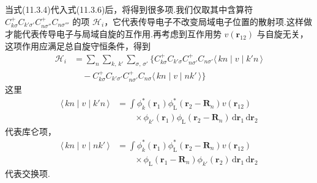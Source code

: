 当式(11.3.4)代入式(11.3.6)后，将得到很多项.我们仅取其中含算符
$C^{+}_{k\sigma}C_{k'\sigma'}C^{+}_{n\sigma''}C_{n\sigma'''}$
的项 $\mathscr{H}_{i}$，它代表传导电子不改变局域电子位置的散射项.这样做才能代表传导电子与局域自旋的互作用.再考虑到互作用势 $v(\boldsymbol{r}_{12})$ 与自旋无关，这项作用应满足总自旋守恒条件，得到
\begin{equation}
\begin{aligned}
  \mathscr{H}_{i}&=\sum_{n}\sum_{k,\,k'}\sum_{\sigma,\,\sigma'}
  \bigl\{C^{+}_{k\sigma}C_{k'\sigma}C^{+}_{n\sigma'}C_{n\sigma'}
  \langle\,kn\mid v\mid k'n\,\rangle\\
  &\quad-C^{+}_{k\sigma}C_{k'\sigma'}C^{+}_{n\sigma'}C_{n\sigma}
  \langle\,kn\mid v\mid nk'\,\rangle\bigr\}
\end{aligned}
\end{equation}
这里
\begin{equation}
\begin{aligned}
  \langle\,kn\mid v\mid k'n\,\rangle
  &=\int\phi^{*}_{k}(\boldsymbol{r}_{1})
  \phi^{*}_{\mathrm{L}}(\boldsymbol{r}_{2}-\boldsymbol{R}_{n})
  v(\boldsymbol{r}_{12})\\
  &\qquad\times\phi_{k'}(\boldsymbol{r}_{1})
  \phi_{\mathrm{L}}(\boldsymbol{r}_{2}-\boldsymbol{R}_{n})
  \,\mathrm{d}\boldsymbol{r}_{1}\,\mathrm{d}\boldsymbol{r}_{2}
\end{aligned}
\end{equation}
代表库仑项，
\begin{equation}
\begin{aligned}
  \langle\,kn\mid v\mid nk'\,\rangle
  &=\int\phi^{*}_{k}(\boldsymbol{r}_{1})
  \phi^{*}_{\mathrm{L}}(\boldsymbol{r}_{2}-\boldsymbol{R}_{n})
  v(\boldsymbol{r}_{12})\\
  &\qquad\times\phi_{\mathrm{L}}(\boldsymbol{r}_{1}-\boldsymbol{R}_{n})
  \phi_{k'}(\boldsymbol{r}_{2})
  \,\mathrm{d}\boldsymbol{r}_{1}\,\mathrm{d}\boldsymbol{r}_{2}
\end{aligned}
\end{equation}
代表交换项.

